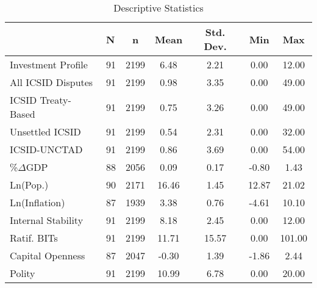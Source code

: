 \documentclass[12pt,onesided]{amsart}
\begin{document}
\begin{table}[ht]
\centering
\caption{Descriptive Statistics}
\label{tab:descStats}
\begin{tabular}{llccccc}
	  \hline\hline
	  & N & n & Mean & Std. Dev. & Min & Max \\ 
	  \hline
	Investment Profile & 91 & 2199 & 6.48 & 2.21 & 0.00 & 12.00 \\ 
	  All ICSID Disputes & 91 & 2199 & 0.98 & 3.35 & 0.00 & 49.00 \\ 
	  ICSID Treaty-Based & 91 & 2199 & 0.75 & 3.26 & 0.00 & 49.00 \\ 
	  Unsettled ICSID & 91 & 2199 & 0.54 & 2.31 & 0.00 & 32.00 \\ 
	  ICSID-UNCTAD & 91 & 2199 & 0.86 & 3.69 & 0.00 & 54.00 \\ 
	  \%$\Delta$GDP & 88 & 2056 & 0.09 & 0.17 & -0.80 & 1.43 \\ 
	  Ln(Pop.) & 90 & 2171 & 16.46 & 1.45 & 12.87 & 21.02 \\ 
	  Ln(Inflation) & 87 & 1939 & 3.38 & 0.76 & -4.61 & 10.10 \\ 
	  Internal Stability & 91 & 2199 & 8.18 & 2.45 & 0.00 & 12.00 \\ 
	  Ratif. BITs & 91 & 2199 & 11.71 & 15.57 & 0.00 & 101.00 \\ 
	  Capital Openness & 87 & 2047 & -0.30 & 1.39 & -1.86 & 2.44 \\ 
	  Polity & 91 & 2199 & 10.99 & 6.78 & 0.00 & 20.00 \\ 
	   \hline\hline
\end{tabular}
\end{table}

\end{document}
